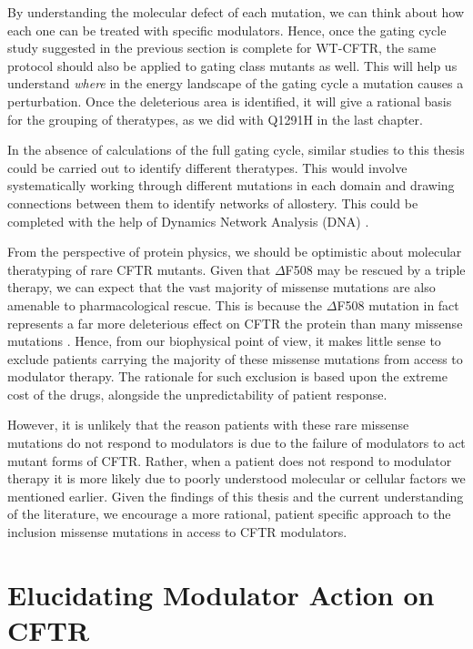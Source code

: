 By understanding the molecular defect of each mutation, we can think about how each one can be treated with specific modulators. Hence, once the gating cycle study suggested in the previous section is complete for WT-CFTR, the same protocol should also be applied to gating class mutants as well. This will help us understand \textit{where} in the energy landscape of the gating cycle a mutation causes a perturbation. Once the deleterious area is identified, it will give a rational basis for the grouping of theratypes, as we did with Q1291H in the last chapter.

In the absence of calculations of the full gating cycle, similar studies to this thesis could be carried out to identify different theratypes. This would involve systematically working through different mutations in each domain and drawing connections between them to identify networks of allostery. This could be completed with the help of Dynamics Network Analysis (DNA) \cite{melo2020}. 

From the perspective of protein physics, we should be optimistic about molecular theratyping of rare CFTR mutants. Given that $\Delta$F508 may be rescued by a triple therapy, we can expect that the vast majority of missense mutations are also amenable to pharmacological rescue. This is because the $\Delta$F508 mutation in fact represents a far more deleterious effect on CFTR the protein than many missense mutations \cite{bahia2021}. Hence, from our biophysical point of view, it makes little sense to exclude patients carrying the majority of these missense mutations from access to modulator therapy. The rationale for such exclusion is based upon the extreme cost of the drugs, alongside the unpredictability of patient response. 

However, it is unlikely that the reason patients with these rare missense mutations do not respond to modulators is due to the failure of modulators to act mutant forms of CFTR. Rather, when a patient does not respond to modulator therapy it is more likely due to poorly understood molecular or cellular factors we mentioned earlier. Given the findings of this thesis and the current understanding of the literature, we encourage a more rational, patient specific approach to the inclusion missense mutations in access to CFTR modulators. 


\section{Elucidating Modulator Action on CFTR}

